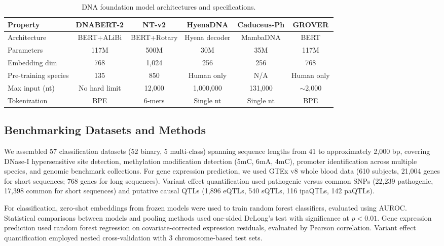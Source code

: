 \documentclass[11pt]{article}
\begin{document}
\begin{table}[htbp]
\centering
\caption{DNA foundation model architectures and specifications.}
\label{tab:models}
\begin{adjustbox}{max width=\textwidth}
\begin{tabular}{lccccc}
\toprule
Property & DNABERT-2 & NT-v2 & HyenaDNA & Caduceus-Ph & GROVER \\
\midrule
Architecture & BERT+ALiBi & BERT+Rotary & Hyena decoder & MambaDNA & BERT \\
Parameters & 117M & 500M & 30M & 35M & 117M \\
Embedding dim & 768 & 1,024 & 256 & 256 & 768 \\
Pre-training species & 135 & 850 & Human only & N/A & Human only \\
Max input (nt) & No hard limit & 12,000 & 1,000,000 & 131,000 & $\sim$2,000 \\
Tokenization & BPE & 6-mers & Single nt & Single nt & BPE \\
\bottomrule
\end{tabular}
\end{adjustbox}
\end{table}

\subsection{Benchmarking Datasets and Methods}

We assembled 57 classification datasets (52 binary, 5 multi-class) spanning sequence lengths from 41 to approximately 2,000 bp, covering DNase-I hypersensitive site detection, methylation modification detection (5mC, 6mA, 4mC), promoter identification across multiple species, and genomic benchmark collections. For gene expression prediction, we used GTEx v8 whole blood data (610 subjects, 21,004 genes for short sequences; 768 genes for long sequences). Variant effect quantification used pathogenic versus common SNPs (22,239 pathogenic, 17,398 common for short sequences) and putative causal QTLs (1,896 eQTLs, 540 sQTLs, 116 ipaQTLs, 142 paQTLs).

For classification, zero-shot embeddings from frozen models were used to train random forest classifiers, evaluated using AUROC. Statistical comparisons between models and pooling methods used one-sided DeLong's test with significance at $p < 0.01$. Gene expression prediction used random forest regression on covariate-corrected expression residuals, evaluated by Pearson correlation. Variant effect quantification employed nested cross-validation with 3 chromosome-based test sets.
\end{document}
